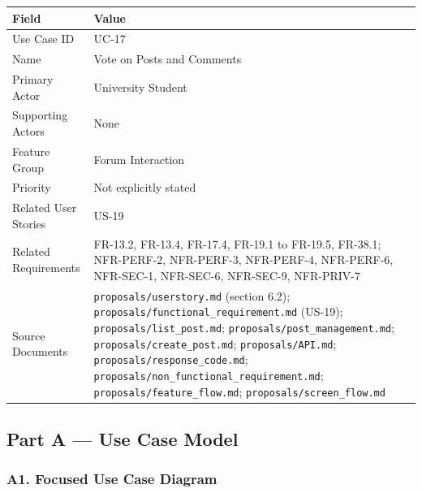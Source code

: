 \documentclass[12pt]{article}
\renewcommand{\baselinestretch}{1.5}
\begin{document}
\begingroup
\small
\renewcommand{\baselinestretch}{1.0}\selectfont
\renewcommand{\arraystretch}{1.15}
\setlength{\tabcolsep}{6pt}
\begin{longtable}{|>{\raggedright\arraybackslash}p{}|>{\raggedright\arraybackslash}p{}|}
\hline
\textbf{Field} & \textbf{Value} \\ \hline
\endhead
Use Case ID & UC-17 \\ \hline
Name & Vote on Posts and Comments \\ \hline
Primary Actor & University Student \\ \hline
Supporting Actors & None \\ \hline
Feature Group & Forum Interaction \\ \hline
Priority & Not explicitly stated \\ \hline
Related User Stories & US-19 \\ \hline
Related Requirements & FR-13.2, FR-13.4, FR-17.4, FR-19.1 to FR-19.5, FR-38.1; NFR-PERF-2, NFR-PERF-3, NFR-PERF-4, NFR-PERF-6, NFR-SEC-1, NFR-SEC-6, NFR-SEC-9, NFR-PRIV-7 \\ \hline
Source Documents & \texttt{proposals/userstory.md} (section 6.2); \texttt{proposals/functional\_requirement.md} (US-19); \texttt{proposals/list\_post.md}; \texttt{proposals/post\_management.md}; \texttt{proposals/create\_post.md}; \texttt{proposals/API.md}; \texttt{proposals/response\_code.md}; \texttt{proposals/non\_functional\_requirement.md}; \texttt{proposals/feature\_flow.md}; \texttt{proposals/screen\_flow.md} \\ \hline
\end{longtable}
\endgroup
\par\medskip

\hypertarget{sec:part-a-use-case-model}{}
\subsection*{Part A --- Use Case Model}
\par\medskip

\hypertarget{sec:a1-focused-use-case-diagram}{}
\subsubsection*{A1. Focused Use Case Diagram}
\par\medskip
\end{document}
